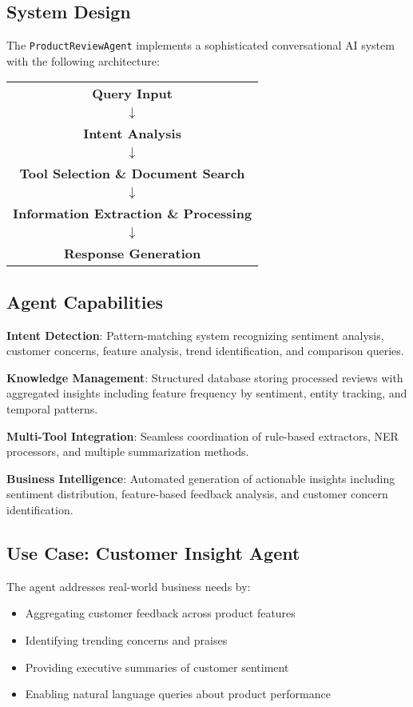 \documentclass[11pt,a4paper]{article}
\begin{document}
\subsection{System Design}

The \texttt{ProductReviewAgent} implements a sophisticated conversational AI system with the following architecture:

\begin{center}
\begin{tabular}{c}
\textbf{Query Input} \\
$\downarrow$ \\
\textbf{Intent Analysis} \\
$\downarrow$ \\
\textbf{Tool Selection \& Document Search} \\
$\downarrow$ \\
\textbf{Information Extraction \& Processing} \\
$\downarrow$ \\
\textbf{Response Generation}
\end{tabular}
\end{center}

\subsection{Agent Capabilities}

\textbf{Intent Detection}: Pattern-matching system recognizing sentiment analysis, customer concerns, feature analysis, trend identification, and comparison queries.

\textbf{Knowledge Management}: Structured database storing processed reviews with aggregated insights including feature frequency by sentiment, entity tracking, and temporal patterns.

\textbf{Multi-Tool Integration}: Seamless coordination of rule-based extractors, NER processors, and multiple summarization methods.

\textbf{Business Intelligence}: Automated generation of actionable insights including sentiment distribution, feature-based feedback analysis, and customer concern identification.

\subsection{Use Case: Customer Insight Agent}

The agent addresses real-world business needs by:
\begin{itemize}[itemsep=0pt]
    \item Aggregating customer feedback across product features
    \item Identifying trending concerns and praises
    \item Providing executive summaries of customer sentiment
    \item Enabling natural language queries about product performance
\end{itemize}
\end{document}
